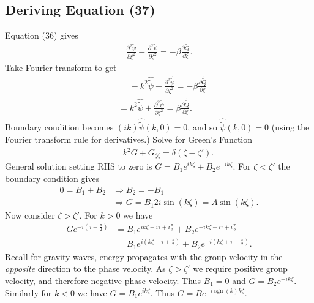 \documentclass[12pt]{article}
\DeclareMathOperator{\sgn}{sgn}
\begin{document}
\subsection{Deriving Equation (37)}
Equation (36) gives
\begin{align*}
\frac{\partial ^2 \tilde{\psi}}{\partial \xi^2} - \frac{\partial ^2 \tilde{\psi}}{\partial \zeta^2} = -\beta \frac{\partial \tilde{Q}}{\partial \xi}.
\end{align*}
Take Fourier transform to get
\begin{align*}
& \phantom{=} -k^2 \widehat{\tilde{\psi}} - \frac{\partial ^2 \widehat{\tilde{\psi}}}{\partial \zeta^2} = -\beta \frac{\partial \widehat{\tilde{Q}}}{\partial \xi} \\
&= k^2 \widehat{\tilde{\psi}} + \frac{\partial ^2 \widehat{\tilde{\psi}}}{\partial \zeta^2} = \beta \frac{\partial \widehat{\tilde{Q}}}{\partial \xi}.
\end{align*}
Boundary condition becomes $\left(ik\right)\widehat{\tilde{\psi}}(k,0)=0$, and so $\widehat{\tilde{\psi}}(k,0)=0$ (using the Fourier transform rule for derivatives.) Solve for Green's Function
\begin{align}
&\phantom{=} k^2 G + G_{\zeta\zeta} = \delta\left(\zeta-\zeta'\right).
\label{Eq:Greens}
\end{align}
General solution setting RHS to zero is $G=B_1 e^{i k\zeta} + B_2 e^{-ik\zeta}$. For $\zeta < \zeta'$ the boundary condition gives
\begin{align*}
0=B_1+B_2 & \Rightarrow B_2 = -B_1 \\
& \Rightarrow G = B_1 2i \sin(k\zeta) = A \sin(k\zeta).
\end{align*}
Now consider $\zeta > \zeta'$. For $k>0$ we have
\begin{align*}
G e^{-i\left(\tau-\frac{\pi}{2}\right)} &= B_1 e^{i k\zeta-i\tau+i\frac{\pi}{2}} + B_2 e^{-ik\zeta-i\tau+i\frac{\pi}{2}} \\
&= B_1 e^{i \left(k\zeta-\tau+\frac{\pi}{2}\right)} + B_2 e^{-i\left(k\zeta+\tau-\frac{\pi}{2}\right)}.
\end{align*}
Recall for gravity waves, energy propagates with the group velocity in the \textit{opposite} direction to the phase velocity. As $\zeta>\zeta'$ we require positive group velocity, and therefore negative phase velocity. Thus $B_1=0$ and $G=B_2e^{-ik\zeta}$. Similarly for $k<0$ we have $G=B_1e^{ik\zeta}$. Thus $G=Be^{-i\sgn(k)k\zeta}$.
\end{document}
